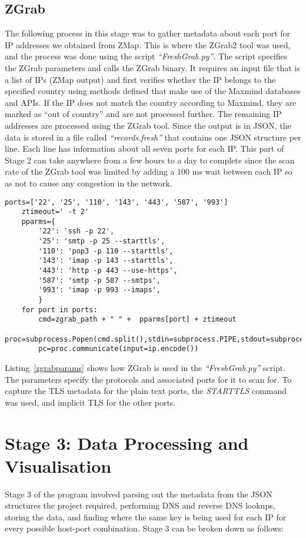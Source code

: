 \subsection{ZGrab}
The following process in this stage was to gather metadata about each port for IP addresses we obtained from ZMap. This is where the ZGrab2 tool was used, and the process was done using the script 
\textit{``FreshGrab.py''}. The script specifies the ZGrab parameters and calls the ZGrab binary. It requires an input file that is a list of IPs (ZMap output) and first verifies whether the IP belongs to the 
specified country using methods defined that make use of the Maxmind databases and APIs. If the IP does not match the country according to Maxmind, they are marked as ``out of country'' and are not processed further. 
The remaining IP addresses are processed using the ZGrab tool. Since the output is in JSON, the data is stored in a file called \textit{``records.fresh''} that 
contains one JSON structure per line. Each line has information about all seven ports for each IP. This part of Stage 2 can take anywhere 
from a few hours to a day to complete since the scan rate of the ZGrab tool was limited by adding a 100 ms wait between each IP so as not to cause any congestion in the network. 
\pagebreak

\begin{lstlisting}[caption={ZGrab2 Parameters}, captionpos=b, label={zgrabparams}]
    ports=['22', '25', '110', '143', '443', '587', '993']
    ztimeout=' -t 2'
    pparms={ 
        '22': 'ssh -p 22',
        '25': 'smtp -p 25 --starttls',
        '110': 'pop3 -p 110 --starttls',
        '143': 'imap -p 143 --starttls',
        '443': 'http -p 443 --use-https',
        '587': 'smtp -p 587 --smtps',
        '993': 'imap -p 993 --imaps',
        }
    for port in ports:
        cmd=zgrab_path + " " +  pparms[port] + ztimeout
        proc=subprocess.Popen(cmd.split(),stdin=subprocess.PIPE,stdout=subprocess.PIPE)
        pc=proc.communicate(input=ip.encode())
\end{lstlisting}

\noindent Listing~\ref*{zgrabparams} shows how ZGrab is used in the \textit{``FreshGrab.py''} script. The parameters specify the protocols and 
associated ports for it to scan for. To capture the TLS metadata for the plain text ports, the \textit{STARTTLS} command was used,
and implicit TLS for the other ports.

\section{Stage 3: Data Processing and Visualisation}
\label{stage3}
Stage 3 of the program involved parsing out the metadata from the JSON structures the project required, performing DNS and reverse DNS lookups, 
storing the data, and finding where the same key is being used for each IP for every possible host-port combination. Stage 3 can be broken down as follows:

